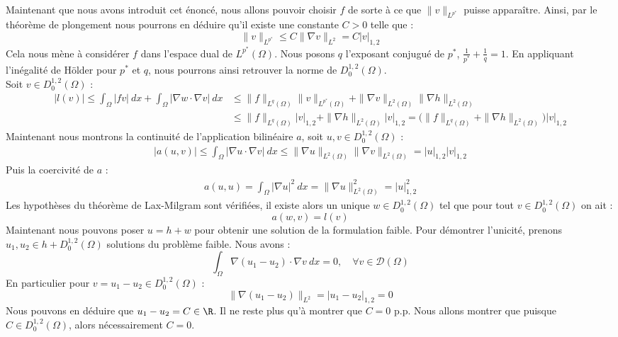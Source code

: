 \\
Maintenant que nous avons introduit cet énoncé, nous allons pouvoir choisir $f$ de sorte à ce que $\|v\|_{L^{p^*}}$ puisse apparaître. Ainsi, par le théorème de plongement nous pourrons en déduire qu'il existe une constante $C > 0$ telle que :
$$ \|v\|_{L^{p^*}} \leq C \|\nabla v\|_{L^2} = C |v|_{1,2} $$
Cela nous mène à considérer $f$ dans l'espace dual de $L^{p^*}(\Omega)$. Nous posons $q$ l'exposant conjugué de $p^*$, $\frac{1}{p^*} + \frac{1}{q} = 1$. En appliquant l'inégalité de Hölder pour $p^*$ et $q$, nous pourrons ainsi retrouver la norme de $D_0^{1,2}(\Omega)$.\\
Soit $v \in D^{1,2}_0(\Omega)$ : \\
\begin{align*}
    |l(v)| \leq \int_{\Omega} |fv| \ dx + \int_{\Omega} |\nabla w \cdot \nabla v| \ dx &\leq \|f\|_{L^q(\Omega)} \|v\|_{L^{p^*}(\Omega)} + \|\nabla v\|_{L^2(\Omega)} \|\nabla h\|_{L^2(\Omega)}  \\
    &\leq \|f\|_{L^q(\Omega)}|v|_{1,2} + \|\nabla h\|_{L^2(\Omega)}|v|_{1,2} = \Big(\|f\|_{L^q(\Omega)} + \|\nabla h\|_{L^2(\Omega)}\Big)|v|_{1,2}
\end{align*}
Maintenant nous montrons la continuité de l'application bilinéaire $a$, soit $u,v \in D^{1,2}_0(\Omega)$ :
\begin{align*}
    |a(u,v)| \leq \int_{\Omega} |\nabla u \cdot \nabla v| \ dx \leq \|\nabla u\|_{L^2(\Omega)}\|\nabla v\|_{L^2(\Omega)} = |u|_{1,2}|v|_{1,2}
\end{align*}
Puis la coercivité de $a$ :
\begin{align*}
    a(u,u) = \int_{\Omega} |\nabla u|^2 \ dx = \|\nabla u\|^2_{L^2(\Omega)} = |u|_{1,2}^2
\end{align*}
Les hypothèses du théorème de Lax-Milgram sont vérifiées, il existe alors un unique $w \in D_0^{1,2}(\Omega)$ tel que pour tout $v \in D_0^{1,2}(\Omega)$ on ait :
$$ a(w,v) = l(v) $$
Maintenant nous pouvons poser $u = h + w$ pour obtenir une solution de la formulation faible.
Pour démontrer l'unicité, prenons $u_1,u_2 \in h + D_0^{1,2}(\Omega)$ solutions du problème faible. Nous avons :
$$\int_{\Omega} \nabla (u_1 - u_2) \cdot \nabla v \ dx = 0, \quad \forall v \in \mathcal{D}(\Omega)$$
En particulier pour $v = u_1 - u_2 \in D_0^{1,2}(\Omega)$ :
$$ \|\nabla (u_1 - u_2)\|_{L^2} = |u_1 - u_2|_{1,2} = 0 $$
Nous pouvons en déduire que $u_1 - u_2 = C \in \R$. Il ne reste plus qu'à montrer que $C = 0$ p.p. Nous allons montrer que puisque $C \in D_0^{1,2}(\Omega)$, alors nécessairement $C = 0$.
